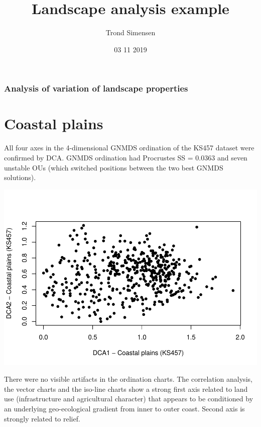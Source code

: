 \documentclass[]{article}
\title{Landscape analysis example}
\author{Trond Simensen}
\date{03 11 2019}
\begin{document}
\maketitle

\hypertarget{analysis-of-variation-of-landscape-properties}{%
\subsubsection{Analysis of variation of landscape
properties}\label{analysis-of-variation-of-landscape-properties}}

\hypertarget{coastal-plains}{%
\section{Coastal plains}\label{coastal-plains}}

All four axes in the 4-dimensional GNMDS ordination of the KS457 dataset
were confirmed by DCA. GNMDS ordination had Procrustes SS = 0.0363 and
seven unstable OUs (which switched positions between the two best GNMDS
solutions).

\includegraphics{Landscape_analysis_example_4_files/figure-latex/unnamed-chunk-3-1.pdf}

There were no visible artifacts in the ordination charts. The
correlation analysis, the vector charts and the iso-line charts show a
strong first axis related to land use (infrastructure and agricultural
character) that appears to be conditioned by an underlying
geo-ecological gradient from inner to outer coast. Second axis is
strongly related to relief.
\end{document}
